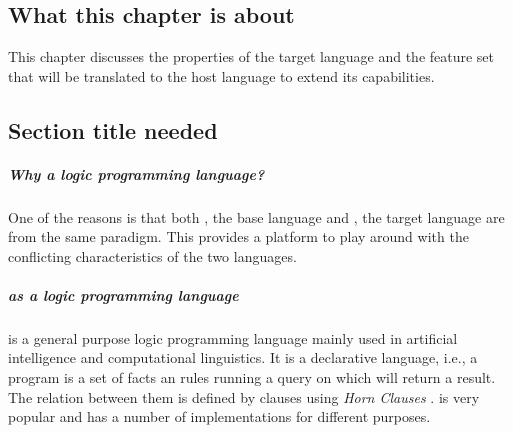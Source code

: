 \documentclass[thesis-solanki.tex]{subfiles}
\begin{document}
\chapter{}\label{chap:pwp}


\section{What this chapter is about}

This chapter discusses the properties of the target language  and the feature set that will be translated to the host 
language to extend its capabilities.

\section{Section title needed}

\paragraph{Why a logic programming language?}


One of the reasons is that both , the base language and , the target language are from the same paradigm.
This provides a platform to play around with the conflicting characteristics of the two languages.

\paragraph{ as a logic programming language}
 is a general purpose logic programming language mainly used in artificial intelligence and
  computational linguistics.
  It is a declarative language, i.e., a program is a set of facts an rules running a
  query on which will return a result.
  The relation between them is defined by clauses using \textit{Horn Clauses} \cite{wikiprolog}.
   is very popular and has a number of implementations
  \cite{website:comparisonofprologimplementationswiki} for different purposes.
\end{document}
